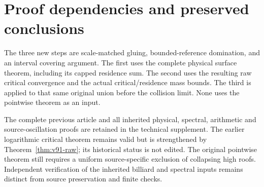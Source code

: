 \documentclass[11pt,reqno]{amsart}
\numberwithin{equation}{section}
\theoremstyle{definition}
\theoremstyle{remark}\newtheorem{remark}[theorem]{Remark}
\begin{document}





\section{Proof dependencies and preserved conclusions}
The three new steps are scale-matched gluing, bounded-reference
domination, and an interval covering argument. The first uses the
complete physical surface theorem, including its capped residence
sum. The second uses the resulting raw critical convergence and the
actual critical/residence mass bounds. The third is applied to that
same original union before the collision limit. None uses the
pointwise theorem as an input.

The complete previous article and all inherited physical, spectral,
arithmetic and source-oscillation proofs are retained in the technical
supplement. The earlier logarithmic critical theorem remains valid
but is strengthened by Theorem~\ref{thm:v91-raw}; its historical
status is not edited. The original pointwise theorem still requires
a uniform source-specific exclusion of collapsing high roofs.
Independent verification of the inherited billiard and spectral
inputs remains distinct from source preservation and finite checks.


\end{document}
